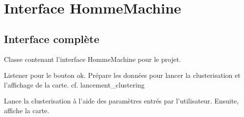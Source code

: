 \documentclass[letterpaper,10pt,french]{sphinxmanual}
\begin{document}
\chapter{Interface Homme\sphinxhyphen{}Machine}
\label{\detokenize{index:interface-homme-machine}}

\section{Interface complète}
\label{\detokenize{index:module-src.ihm.ihm_complet}}\label{\detokenize{index:interface-complete}}

\begin{fulllineitems}
\label{\detokenize{index:src.ihm.ihm_complet.Wind}}
\sphinxAtStartPar
Classe contenant l’interface Homme\sphinxhyphen{}Machine pour le projet.

\begin{fulllineitems}
\label{\detokenize{index:src.ihm.ihm_complet.Wind.appui_bouton_OK}}
\sphinxAtStartPar
Listener pour le bouton ok.
Prépare les données pour lancer la clusterisation et l’affichage de la carte.
cf. lancement\_clustering

\end{fulllineitems}


\begin{fulllineitems}
\label{\detokenize{index:src.ihm.ihm_complet.Wind.lancement_clustering}}
\sphinxAtStartPar
Lance la clusterisation à l’aide des paramètres entrés par l’utilisateur.
Ensuite, affiche la carte.

\end{fulllineitems}


\end{fulllineitems}
\end{document}
